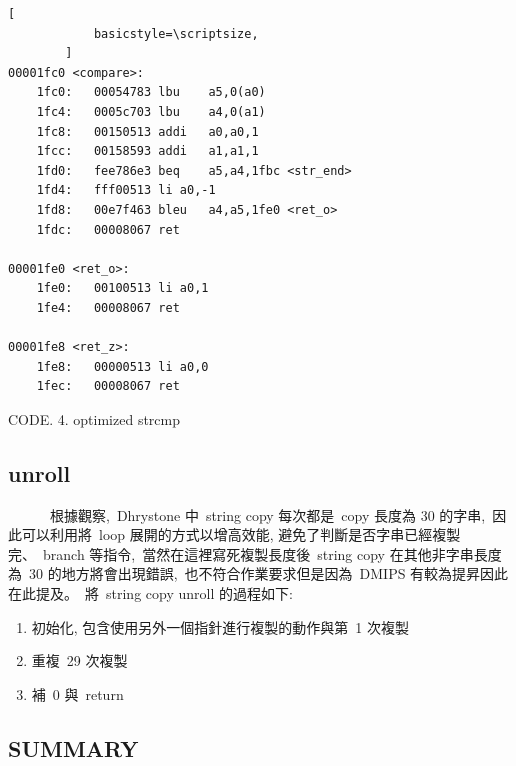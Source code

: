 \documentclass{article}
\begin{document}
\begin{CJK*}{UTF8}{bsmi}
\begin{multicols}{2}
\begin{flushleft}
\begin{center}
\begin{lstlisting}[
            basicstyle=\scriptsize, 
        ]
00001fc0 <compare>:
    1fc0:	00054783 lbu	a5,0(a0)
    1fc4:	0005c703 lbu	a4,0(a1)
    1fc8:	00150513 addi	a0,a0,1
    1fcc:	00158593 addi	a1,a1,1
    1fd0:	fee786e3 beq	a5,a4,1fbc <str_end>
    1fd4:	fff00513 li	a0,-1
    1fd8:	00e7f463 bleu	a4,a5,1fe0 <ret_o>
    1fdc:	00008067 ret

00001fe0 <ret_o>:
    1fe0:	00100513 li	a0,1
    1fe4:	00008067 ret

00001fe8 <ret_z>:
    1fe8:	00000513 li	a0,0
    1fec:	00008067 ret
        \end{lstlisting}
        \small CODE. 4. optimized strcmp
    \end{center}    
\end{flushleft}

\begin{center}
    \subsection*{unroll}            
\end{center}

\begin{flushleft}
    \ \ \ \ \ \ 根據觀察,\ Dhrystone 中\ string copy 每次都是\ copy 長度為 30 的字串,\
    因此可以利用將\ loop 展開的方式以增高效能, 避免了判斷是否字串已經複製完、\ branch 等指令,\
    當然在這裡寫死複製長度後\ string copy 在其他非字串長度為\ 30 的地方將會出現錯誤,\
    也不符合作業要求但是因為\ DMIPS 有較為提昇因此在此提及。\
    將\ string copy unroll 的過程如下:

    \begin{enumerate}
        \item 初始化, 包含使用另外一個指針進行複製的動作與第\ 1 次複製
        \item 重複\ 29 次複製
        \item 補\ 0 與\ return
    \end{enumerate}
\end{flushleft}

\begin{center}
    \section*{SUMMARY}
\end{center}


\end{multicols}
\end{CJK*}
\end{document}
